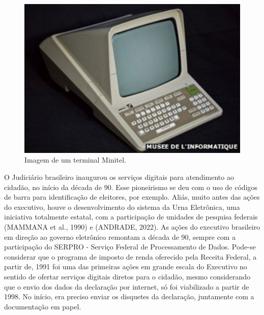 \captionsetup{format=plain}
\begin{figure}[p]

\centering


\begin{minipage}[b]{0.4\linewidth}
        \centering
                \includegraphics[width=1.0\linewidth]{../../../imagens/minitel.jpg}
                \caption{Imagem de um terminal Minitel.}
                \label{5d9a2782548e094108d5241aeff768916b33be6c}
\end{minipage}%
\hspace{0.5cm}
\end{figure}



O Judiciário brasileiro inaugurou os serviços digitais para atendimento ao cidadão, no início da década de 90. Esse pioneirismo se deu com o uso de códigos de barra para identificação de eleitores, por exemplo. Aliás, muito antes das ações do executivo, houve o desenvolvimento do sistema da Urna Eletrônica, uma iniciativa totalmente estatal, com a participação de unidades de pesquisa federais (MAMMANA et al., 1990) e (ANDRADE, 2022). As ações do executivo brasileiro em direção ao governo eletrônico remontam a década de 90, sempre com a participação do SERPRO - Serviço Federal de Processamento de Dados. Pode-se considerar que o programa de imposto de renda oferecido pela Receita Federal, a partir de, 1991 foi uma das primeiras ações em grande escala do Executivo no sentido de ofertar serviços digitais diretos para o cidadão, mesmo considerando que o envio dos dados da declaração por internet, só foi viabilizado a partir de 1998. No início, era preciso enviar os disquetes da declaração, juntamente com a documentação em papel.

